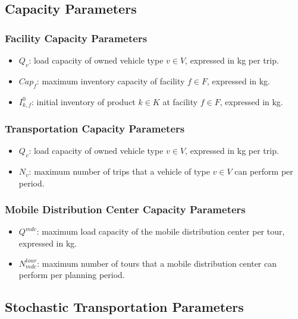 \documentclass[12pt]{article}
\begin{document}
\subsection{Capacity Parameters}

\subsubsection{Facility Capacity Parameters}
\begin{itemize}
    \item $Q_v$: load capacity of owned vehicle type $v \in V$, expressed in kg per trip.

    \item $Cap_f$: maximum inventory capacity of facility $f \in F$, expressed in kg.

    \item $I^0_{k,f}$: initial inventory of product $k \in K$ at facility $f \in F$, expressed in kg.
\end{itemize}

\subsubsection{Transportation Capacity Parameters}
\begin{itemize}
    \item $Q_v$: load capacity of owned vehicle type $v \in V$, expressed in kg per trip.

    \item $N_v$: maximum number of trips that a vehicle of type $v \in V$ can perform per period.
\end{itemize}

\subsubsection{Mobile Distribution Center Capacity Parameters}
\begin{itemize}
    \item $Q^{mdc}$: maximum load capacity of the mobile distribution center per tour, expressed in kg.

    \item $N^{tour}_{mdc}$: maximum number of tours that a mobile distribution center can perform per planning period.
     
\end{itemize}

\subsection{Stochastic Transportation Parameters}
\end{document}
